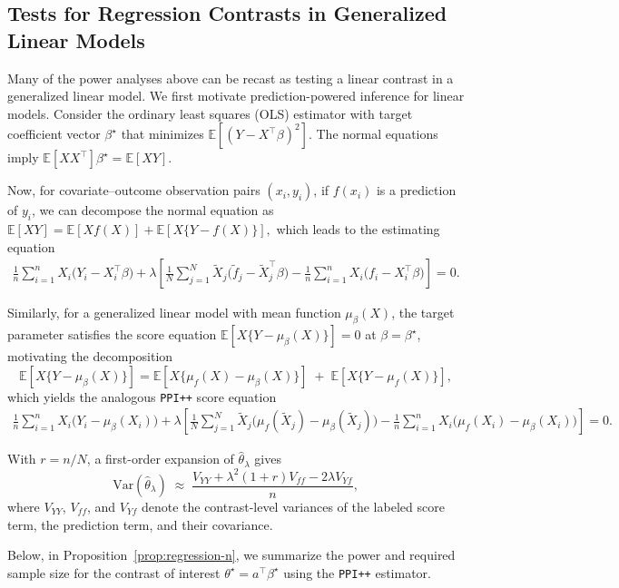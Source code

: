 \documentclass[12pt]{article}
\newcommand{\E}{\mathbb{E}}
\newcommand{\Var}{\mathrm{Var}}
\newcommand{\wh}{\widehat}
\newcommand{\wt}{\widetilde}
\begin{document}
\subsection{Tests for Regression Contrasts in Generalized Linear Models}
\label{sec:regression-main}
Many of the power analyses above can be recast as testing a linear
contrast in a generalized linear model. We first motivate
prediction-powered inference for linear models. Consider the ordinary
least squares (OLS) estimator with target coefficient vector
$\beta^\star$ that minimizes $\E[(Y - X^\top\beta)^2]$. The normal
equations imply $\E[XX^\top]\beta^\star = \E[XY]$. 

Now, for covariate--outcome observation pairs $(x_i,y_i)$, if $f(x_i)$ is a
prediction of $y_i$, we can decompose the normal equation as
$\E[XY] = \E[Xf(X)] + \E[X\{Y-f(X)\}],$
which leads to the estimating equation
\[
\begin{aligned}
\frac{1}{n}\sum_{i=1}^n X_i\big(Y_i - X_i^\top\beta\big) +
\lambda\left[
\frac{1}{N}\sum_{j=1}^N \wt{X}_j\big(\wt{f}_j - \wt{X}_j^\top\beta\big)
-
\frac{1}{n}\sum_{i=1}^n X_i\big(f_i - X_i^\top\beta\big)
\right] = 0.
\end{aligned}
\]

Similarly, for a generalized linear model with mean function $\mu_\beta(X)$,
the target parameter satisfies the score equation
$\E[X\{Y-\mu_\beta(X)\}] = 0$ at $\beta=\beta^\star$, motivating the decomposition
\[
\E[X\{Y-\mu_\beta(X)\}]
=
\E[X\{\mu_f(X)-\mu_\beta(X)\}]
\;+\;
\E[X\{Y-\mu_f(X)\}],
\]
which yields the analogous \texttt{PPI++} score equation
\[
\begin{aligned}
\frac{1}{n}\sum_{i=1}^n X_i\big(Y_i-\mu_\beta(X_i)\big) +
\lambda\left[
\frac{1}{N}\sum_{j=1}^N \wt{X}_j\big(\mu_f(\wt{X}_j)-\mu_\beta(\wt{X}_j)\big)
-
\frac{1}{n}\sum_{i=1}^n X_i\big(\mu_f(X_i)-\mu_\beta(X_i)\big)
\right]=0.
\end{aligned}
\]

With $r=n/N$, a first-order expansion of $\wh{\theta}_\lambda$
gives
\[
\Var(\wh{\theta}_\lambda)
\;\approx\;
\frac{V_{YY} + \lambda^2(1+r)V_{ff} - 2\lambda V_{Yf}}{n},
\]
where $V_{YY}$, $V_{ff}$, and $V_{Yf}$ denote the contrast-level
variances of the labeled score term, the prediction term, and their
covariance.

Below, in Proposition~\ref{prop:regression-n}, we summarize the power and required sample
size for the contrast of interest $\theta^\star = a^\top \beta^\star$
using the \texttt{PPI++} estimator.
\end{document}
